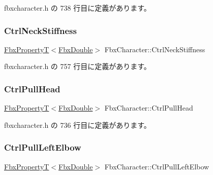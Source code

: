  fbxcharacter.\+h の 738 行目に定義があります。

\mbox{\label{class_fbx_character_a1510025642325ad4b31ac1c93be4d690}} 
\subsubsection{\texorpdfstring{Ctrl\+Neck\+Stiffness}{CtrlNeckStiffness}}
{\footnotesize\ttfamily \hyperlink{class_fbx_property_t}{Fbx\+PropertyT}$<$\hyperlink{fbxtypes_8h_a171e72a1c46fc15c1a6c9c31948c1c5b}{Fbx\+Double}$>$ Fbx\+Character\+::\+Ctrl\+Neck\+Stiffness}



 fbxcharacter.\+h の 757 行目に定義があります。

\mbox{\label{class_fbx_character_a6ed3181826e8efd8b62ae4ea95cd3ef8}} 
\subsubsection{\texorpdfstring{Ctrl\+Pull\+Head}{CtrlPullHead}}
{\footnotesize\ttfamily \hyperlink{class_fbx_property_t}{Fbx\+PropertyT}$<$\hyperlink{fbxtypes_8h_a171e72a1c46fc15c1a6c9c31948c1c5b}{Fbx\+Double}$>$ Fbx\+Character\+::\+Ctrl\+Pull\+Head}



 fbxcharacter.\+h の 736 行目に定義があります。

\mbox{\label{class_fbx_character_a92f7ba20e81f5bbe5ea18bb2476a2daf}} 
\subsubsection{\texorpdfstring{Ctrl\+Pull\+Left\+Elbow}{CtrlPullLeftElbow}}
{\footnotesize\ttfamily \hyperlink{class_fbx_property_t}{Fbx\+PropertyT}$<$\hyperlink{fbxtypes_8h_a171e72a1c46fc15c1a6c9c31948c1c5b}{Fbx\+Double}$>$ Fbx\+Character\+::\+Ctrl\+Pull\+Left\+Elbow}



